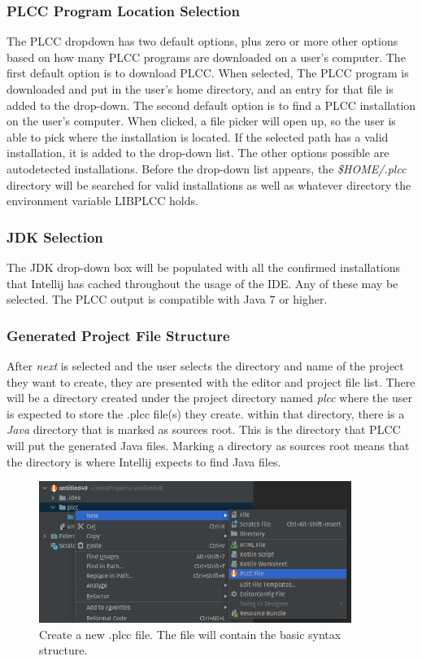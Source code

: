 \documentclass[conference, letterpaper]{IEEEtran}
\begin{document}
\subsubsection{PLCC Program Location Selection}\label{subsubsec:plcc-program-location}
The PLCC dropdown has two default options, plus zero or more other options based on how many PLCC programs are downloaded on a user's computer.
The first default option is to download PLCC\@.
When selected, The PLCC program is downloaded and put in the user's home directory, and an entry for that file is added to the drop-down.
The second default option is to find a PLCC installation on the user's computer.
When clicked, a file picker will open up, so the user is able to pick where the installation is located.
If the selected path has a valid installation, it is added to the drop-down list.
The other options possible are autodetected installations.
Before the drop-down list appears, the \textit{\$HOME/.plcc} directory will be searched for valid installations as well as whatever directory the environment variable LIBPLCC holds.

\subsubsection{JDK Selection}\label{subsubsec:jdk-installation}
The JDK drop-down box will be populated with all the confirmed installations that Intellij has cached throughout the usage of the IDE. Any of these may be selected.
The PLCC output is compatible with Java 7 or higher.

\subsubsection{Generated Project File Structure}\label{subsubsec:generated-project-file-structure}
After \textit{next} is selected and the user selects the directory and name of the project they want to create, they are presented with the editor and project file list.
There will be a directory created under the project directory named \textit{plcc} where the user is expected to store the .plcc file(s) they create.
within that directory, there is a \textit{Java} directory that is marked as sources root.
This is the directory that PLCC will put the generated Java files.
Marking a directory as sources root means that the directory is where Intellij expects to find Java files.

\begin{figure}[!t]
    \centering
    \includegraphics[width=4in]{new_PLCC_file_shortcut.png}
    \caption{Create a new .plcc file. The file will contain the basic syntax structure.}
    \label{fig:new_file_shortcut}
\end{figure}
\end{document}
